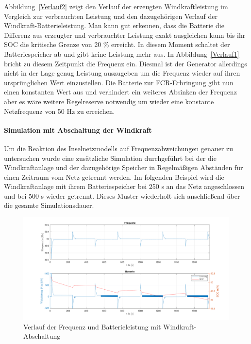 Abbildung~\ref{Verlauf2} zeigt den Verlauf der erzeugten Windkraftleistung im Vergleich zur verbrauchten Leistung
und den dazugehörigen Verlauf der Windkraft-Batterieleistung.
Man kann gut erkennen, dass die Batterie die Differenz aus erzeugter und verbrauchter Leistung exakt ausgleichen kann
bis ihr SOC die kritische Grenze von 20 \% erreicht.
In diesem Moment schaltet der Batteriespeicher ab und gibt keine Leistung mehr aus.
In Abbildung~\ref{Verlauf1} bricht zu diesem Zeitpunkt die Frequenz ein.
Diesmal ist der Generator allerdings nicht in der Lage genug Leistung auszugeben um die Frequenz wieder auf ihren
ursprünglichen Wert einzustellen.
Die Batterie zur FCR-Erbringung gibt nun einen konstanten Wert aus und verhindert ein weiteres Absinken der Frequenz aber
es wäre weitere Regelreserve notwendig um wieder eine konstante Netzfrequenz von 50 Hz zu erreichen.

\paragraph{Simulation mit Abschaltung der Windkraft}
Um die Reaktion des Inselnetzmodells auf Frequenzabweichungen genauer zu untersuchen wurde eine zusätzliche
Simulation durchgeführt bei der die Windkraftanlage und der dazugehörige Speicher in Regelmäßigen Abständen für 
einen Zeitraum vom Netz getrennt werden.
Im folgenden Beispiel wird die Windkraftanlage mit ihrem Batteriespeicher bei 250 s an das Netz angeschlossen
und bei 500 s wieder getrennt.
Dieses Muster wiederholt sich anschließend über die gesamte Simulationsdauer.

\begin{figure}
	\centering
	\includegraphics[width=14cm]{Abbildungen/FreqBat3.png}
	\caption{Verlauf der Frequenz und Batterieleistung mit Windkraft-Abschaltung}\label{Verlauf3}
\end{figure}

